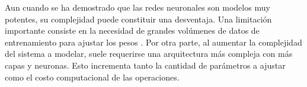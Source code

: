 Aun cuando se ha demostrado que las redes neuronales son modelos muy potentes, su complejidad puede constituir una desventaja. Una limitación importante consiste en la necesidad de grandes volúmenes de datos de entrenamiento para ajustar los pesos \cite{Goodfellow2016}. Por otra parte, al aumentar la complejidad del sistema a modelar, suele requerirse una arquitectura más compleja con más capas y neuronas. Esto incrementa tanto la cantidad de parámetros a ajustar como el costo computacional de las operaciones.
